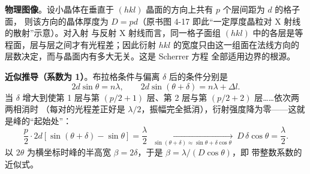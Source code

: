 \begin{principle}
\textbf{物理图像}。设小晶体在垂直于 $(hkl)$ 晶面的方向上共有 $p$ 个层间距为 $d$ 的格子面，
则该方向的晶体厚度为 $D=pd$（原书图 4-17 即此``一定厚度晶粒对 X 射线的散射''示意）。对入射
与反射 X 射线而言，同一格子面组 $(hkl)$ 中的各层是等程面，层与层之间才有光程差；因此衍射
$hkl$ 的宽度只由这一组面在法线方向的层数决定，而与晶面内有多大无关。这是 Scherrer 方程
全部适用边界的根源。

\textbf{近似推导（系数为 1）}。布拉格条件与偏离 $\delta$ 后的条件分别是
\begin{equation}
2d\sin\theta=n\lambda,\qquad 2d\sin(\theta+\delta)=n\lambda+\Delta l .
\label{eq:ch04c-delta}
\end{equation}
当 $\delta$ 增大到使第 1 层与第 $(p/2+1)$ 层、第 2 层与第 $(p/2+2)$ 层……依次两两相消时
（每对的光程差正好是 $\lambda/2$，振幅完全抵消），衍射强度降为零——这就是峰的``起始处''：
\begin{equation}
\frac{p}{2}\cdot 2d\left[\sin(\theta+\delta)-\sin\theta\right]=\frac{\lambda}{2}
\ \xrightarrow[\ \sin(\theta+\delta)\approx\sin\theta+\delta\cos\theta\ ]{}\
D\,\delta\cos\theta=\frac{\lambda}{2}.
\label{eq:ch04c-approx}
\end{equation}
以 $2\theta$ 为横坐标时峰的半高宽 $\beta=2\delta$，于是 $\beta=\lambda/(D\cos\theta)$，即
带整数系数的近似式。


\end{principle}
